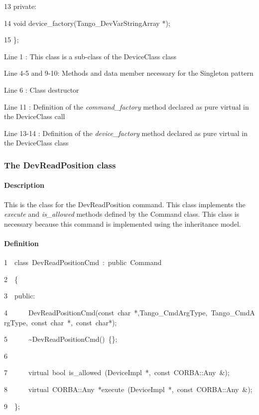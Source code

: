     13  private:

    14          void device\_factory(Tango\_DevVarStringArray {*});

    15  \};



Line 1 : This class is a sub-class of the DeviceClass class

Line 4-5 and 9-10: Methods and data member necessary for the Singleton
pattern

Line 6 : Class destructor

Line 11 : Definition of the \emph{command\_factory}
method declared as pure virtual in the DeviceClass call

Line 13-14 : Definition of the \emph{device\_factory}
method declared as pure virtual in the DeviceClass class

\subsubsection{The DevReadPosition class}

\paragraph{Description}

This is the class for the DevReadPosition command. This class implements
the \emph{execute} and \emph{is\_allowed}
methods defined by the Command class. This class is
necessary because this command is implemented using the inheritance
model.

\paragraph{Definition}


\begin{lyxcode}
1~~class~DevReadPositionCmd~:~public~Command

2~~\{

3~~public:

4~~~~~~DevReadPositionCmd(const~char~{*},Tango\_CmdArgType,~Tango\_CmdArgType,~const~char~{*},~const~char{*});

5~~~~~~\textasciitilde{}DevReadPositionCmd()~\{\};

6~~~~~~~~~~

7~~~~~~virtual~bool~is\_allowed~(DeviceImpl~{*},~const~CORBA::Any~\&);

8~~~~~~virtual~CORBA::Any~{*}execute~(DeviceImpl~{*},~const~CORBA::Any~\&);

9~~\};
\end{lyxcode}


